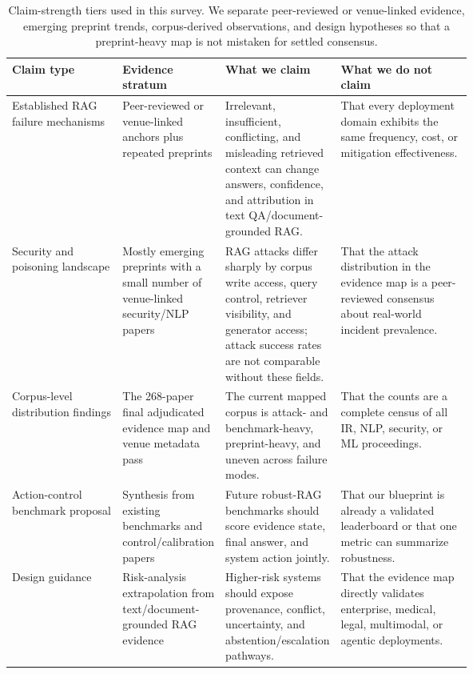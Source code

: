 \begin{table}[t]
\centering
\scriptsize
\renewcommand{\arraystretch}{0.95}
\begin{tabularx}{\linewidth}{>{\raggedright\arraybackslash}p{0.24\linewidth}>{\raggedright\arraybackslash}p{0.18\linewidth}>{\raggedright\arraybackslash}p{0.25\linewidth}X}
\toprule
\textbf{Claim type} & \textbf{Evidence stratum} & \textbf{What we claim} & \textbf{What we do not claim} \\
\midrule
Established RAG failure mechanisms & Peer-reviewed or venue-linked anchors plus repeated preprints & Irrelevant, insufficient, conflicting, and misleading retrieved context can change answers, confidence, and attribution in text QA/document-grounded RAG. & That every deployment domain exhibits the same frequency, cost, or mitigation effectiveness. \\
Security and poisoning landscape & Mostly emerging preprints with a small number of venue-linked security/NLP papers & RAG attacks differ sharply by corpus write access, query control, retriever visibility, and generator access; attack success rates are not comparable without these fields. & That the attack distribution in the evidence map is a peer-reviewed consensus about real-world incident prevalence. \\
Corpus-level distribution findings & The 268-paper final adjudicated evidence map and venue metadata pass & The current mapped corpus is attack- and benchmark-heavy, preprint-heavy, and uneven across failure modes. & That the counts are a complete census of all IR, NLP, security, or ML proceedings. \\
Action-control benchmark proposal & Synthesis from existing benchmarks and control/calibration papers & Future robust-RAG benchmarks should score evidence state, final answer, and system action jointly. & That our blueprint is already a validated leaderboard or that one metric can summarize robustness. \\
Design guidance & Risk-analysis extrapolation from text/document-grounded RAG evidence & Higher-risk systems should expose provenance, conflict, uncertainty, and abstention/escalation pathways. & That the evidence map directly validates enterprise, medical, legal, multimodal, or agentic deployments. \\
\bottomrule
\end{tabularx}
\caption{Claim-strength tiers used in this survey. We separate peer-reviewed or venue-linked evidence, emerging preprint trends, corpus-derived observations, and design hypotheses so that a preprint-heavy map is not mistaken for settled consensus.}
\label{tab:claim-strength}
\end{table}
